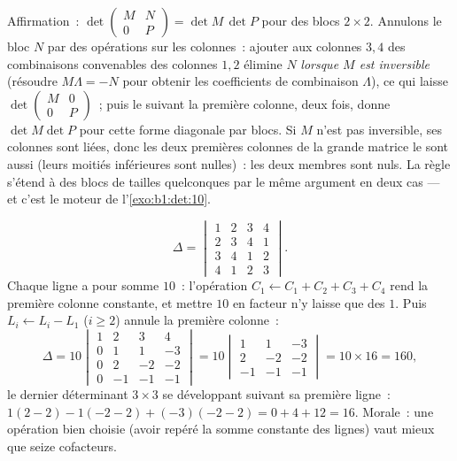 \begin{example}
\label{ex:b1:det:blocktriangular}
Affirmation~: $\det\begin{pmatrix} M & N\\ 0 & P\end{pmatrix} = \det
M\,\det P$ pour des blocs $2\times2$. Annulons le bloc $N$ par des
opérations sur les colonnes~: ajouter aux colonnes $3, 4$ des
combinaisons convenables des colonnes $1, 2$ élimine $N$
\emph{lorsque $M$ est inversible} (résoudre $M\Lambda = -N$ pour
obtenir les coefficients de combinaison $\Lambda$), ce qui laisse
$\det\begin{pmatrix} M & 0\\ 0 & P\end{pmatrix}$~; puis le
 suivant la première colonne, deux
fois, donne $\det M\det P$ pour cette forme diagonale par blocs. Si
$M$ n'est pas inversible, ses colonnes sont liées, donc les deux
premières colonnes de la grande matrice le sont aussi (leurs moitiés
inférieures sont nulles)~: les deux membres sont nuls. La règle
s'étend à des blocs de tailles quelconques par le même argument en
deux cas --- et c'est le moteur de l'\cref{exo:b1:det:10}.
\end{example}

\begin{example}
\label{ex:b1:det:fourbyfour}
\[
\Delta = \begin{vmatrix}
1 & 2 & 3 & 4\\
2 & 3 & 4 & 1\\
3 & 4 & 1 & 2\\
4 & 1 & 2 & 3
\end{vmatrix}.
\]
Chaque ligne a pour somme $10$~: l'opération $C_1 \leftarrow C_1 + C_2 +
C_3 + C_4$ rend la première colonne constante, et mettre $10$ en
facteur n'y laisse que des $1$. Puis $L_i \leftarrow L_i - L_1$
($i \geq 2$) annule la première colonne~:
\[
\Delta = 10\begin{vmatrix}
1 & 2 & 3 & 4\\
0 & 1 & 1 & -3\\
0 & 2 & -2 & -2\\
0 & -1 & -1 & -1
\end{vmatrix}
= 10\begin{vmatrix}
1 & 1 & -3\\
2 & -2 & -2\\
-1 & -1 & -1
\end{vmatrix}
= 10 \times 16 = 160,
\]
le dernier déterminant $3\times3$ se développant suivant sa première
ligne~: $1(2 - 2) - 1(-2 - 2) + (-3)(-2 - 2) = 0 + 4 + 12 = 16$.
Morale~: une opération bien choisie (avoir repéré la somme constante
des lignes) vaut mieux que seize cofacteurs.
\end{example}

